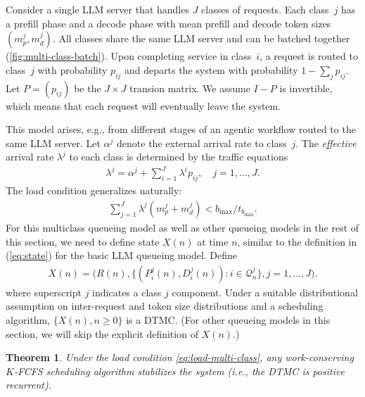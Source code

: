 \documentclass[11pt]{article}
\theoremstyle{plain}
\newtheorem{theorem}{Theorem}
\theoremstyle{definition}
\theoremstyle{remark}
\begin{document}
Consider a single LLM server that handles $J$ classes of requests.  
Each class~$j$ has a prefill
phase and a decode phase with  mean prefill and decode token sizes $(m^j_p, m^j_d)$. All classes share the same LLM server and can be batched together (\cref{fig:multi-class-batch}).
 Upon completing service in class~$i$, a request is routed to class~$j$ with probability $p_{ij}$ and departs the system with probability $1-\sum_{j}p_{ij}$.
Let $P=(p_{ij})$ be the $J\times J$ transion matrix.
 We assume $I-P$ is invertible, which means that each request will eventually leave the system.
  
 
This model arises, e.g., from different stages of an agentic workflow routed to the same LLM server.
 Let 
 $\alpha^j$ denote the external arrival rate to class~$j$.
 The \emph{effective} arrival rate $\lambda^j$ to each class is determined by the traffic equations
\begin{align}\label{eq:traffic}
  \lambda^j = \alpha^j + \sum_{i=1}^{J}\lambda^i p_{ij}, \quad j=1,\ldots,J.
\end{align}
 The load condition generalizes naturally:
\begin{align}\label{eq:load-multi-class}
  \sum_{j=1}^{J}\lambda^j(m^j_p+m^j_d) < b_{\max}/t_{b_{\max}}.
\end{align}
For this  multiclass queueing model as well as other queueing models in the rest of this section, we need to define state $X(n)$ at time $n$, similar to the definition in (\ref{eq:state}) for the basic LLM queueing model. 
Define 
\begin{align}
  \label{eq:state-multiclass}
   X(n) =\Big(R(n), \{(P^j_i(n), D^j_i(n)) : i \in \mathcal{Q}^j_n\}, j=1, \ldots, J\Big).
\end{align}  
where superscript $j$ 
indicates a class $j$ component. Under a suitable distributional assumption on inter-request and token size distributions and a scheduling algorithm, $\{X(n), n\ge 0\}$ is a DTMC. (For other queueing models in this section, we will skip the explicit definition of $X(n)$.)


\begin{theorem}\label{thm:multi-class}
Under the load condition \cref{eq:load-multi-class}, any work-conserving $K$-FCFS scheduling algorithm stabilizes the system (i.e., the DTMC is positive recurrent).
\end{theorem}
\end{document}
